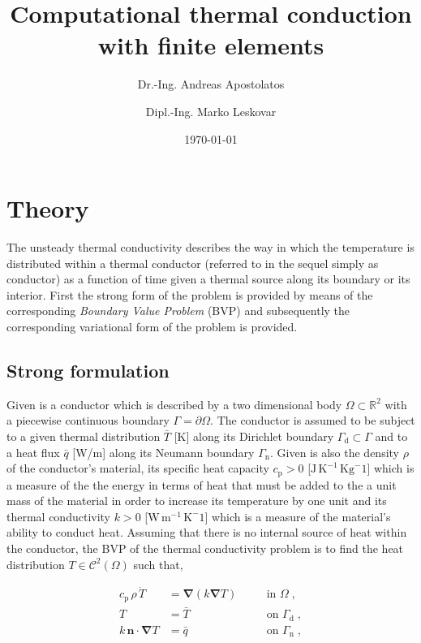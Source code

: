 \documentclass[10pt,a4paper]{article}
\title{Computational thermal conduction with finite elements}
\author{Dr.-Ing. Andreas Apostolatos \and Dipl.-Ing. Marko Leskovar}
\date{\today}
\begin{document}
\sloppy

\maketitle

\section{Theory}\label{sec:theory}

The unsteady thermal conductivity describes the way in which the temperature is distributed within a thermal conductor (referred to in the sequel simply as conductor) as a function of time given a thermal source along its boundary or its interior. First the strong form of the problem is provided by means of the corresponding \textit{Boundary Value Problem} (BVP) and subsequently the corresponding variational form of the problem is provided.

\subsection{Strong formulation}\label{subsec:strong_formulation}

Given is a conductor which is described by a two dimensional body $\Omega \subset \mathbb{R}^2$ with a piecewise continuous boundary $\Gamma = \partial \Omega$. The conductor is assumed to be subject to a given thermal distribution $\bar{T}$ [K] along its Dirichlet boundary $\Gamma_{\text{d}} \subset \Gamma$ and to a heat flux $\bar{q}$ [W/m] along its Neumann boundary $\Gamma_{\text{n}}$. Given is also the density $\rho$ of the conductor's material, its specific heat capacity $c_{\text{p}} > 0$ [$\text{J} \, \text{K}^{-1} \, \text{Kg}^-1$] which is a measure of the the energy in terms of heat that must be added to the a unit mass of the material in order to increase its temperature by one unit and its thermal conductivity $k > 0$ [$\text{W} \, \text{m}^{-1} \, \text{K}^-1$] which is a measure of the material's ability to conduct heat. Assuming that there is no internal source of heat within the conductor, the BVP of the thermal conductivity problem is to find the heat distribution $T \in \mathcal{C}^2(\Omega)$ such that,

\begin{subequations}
	\begin{alignat}{2}
		c_{\text{p}} \, \rho \, \dot{T} &= \boldsymbol{\nabla} (k\boldsymbol{\nabla} T) \quad &&\text{in }\Omega\;, \label{eq:thermal_conduction} \\
		T &= \bar{T} \; &&\text{on } \Gamma_{\text{d}} \;, \label{eq:boundary_dirichlet} \\
		k \, \mathbf{n} \cdot \boldsymbol{\nabla} T &= \bar{q} \label{eq:boundary_flux} \; &&\text{on } \Gamma_{\text{n}} \;,
	\end{alignat}
	\label{eq:thermal_conduction_bvp}
\end{subequations}
\end{document}
